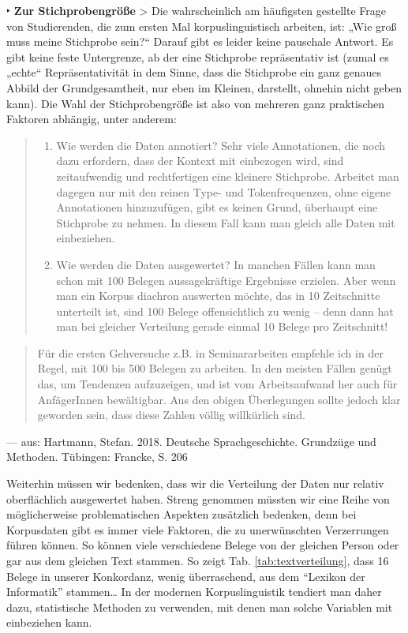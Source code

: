 \documentclass[]{article}
\providecommand{\tightlist}{%
  \setlength{\itemsep}{0pt}\setlength{\parskip}{0pt}}
\begin{document}
 ‣ \textbf{Zur Stichprobengröße} \textgreater{} Die wahrscheinlich am
häufigsten gestellte Frage von Studierenden, die zum ersten Mal
korpuslinguistisch arbeiten, ist: „Wie groß muss meine Stichprobe
sein?`` Darauf gibt es leider keine pauschale Antwort. Es gibt keine
feste Untergrenze, ab der eine Stichprobe repräsentativ ist (zumal es
„echte`` Repräsentativität in dem Sinne, dass die Stichprobe ein ganz
genaues Abbild der Grundgesamtheit, nur eben im Kleinen, darstellt,
ohnehin nicht geben kann). Die Wahl der Stichprobengröße ist also von
mehreren ganz praktischen Faktoren abhängig, unter anderem:

\begin{quote}
\begin{enumerate}
\def\labelenumi{\alph{enumi})}
\tightlist
\item
  Wie werden die Daten annotiert? Sehr viele Annotationen, die noch dazu
  erfordern, dass der Kontext mit einbezogen wird, sind zeitaufwendig
  und rechtfertigen eine kleinere Stichprobe. Arbeitet man dagegen nur
  mit den reinen Type- und Tokenfrequenzen, ohne eigene Annotationen
  hinzuzufügen, gibt es keinen Grund, überhaupt eine Stichprobe zu
  nehmen. In diesem Fall kann man gleich alle Daten mit einbeziehen.
\item
  Wie werden die Daten ausgewertet? In manchen Fällen kann man schon mit
  100 Belegen aussagekräftige Ergebnisse erzielen. Aber wenn man ein
  Korpus diachron auswerten möchte, das in 10 Zeitschnitte unterteilt
  ist, sind 100 Belege offensichtlich zu wenig -- denn dann hat man bei
  gleicher Verteilung gerade einmal 10 Belege pro Zeitschnitt!
\end{enumerate}
\end{quote}

\begin{quote}
Für die ersten Gehversuche z.B. in Seminararbeiten empfehle ich in der
Regel, mit 100 bis 500 Belegen zu arbeiten. In den meisten Fällen genügt
das, um Tendenzen aufzuzeigen, und ist vom Arbeitsaufwand her auch für
AnfägerInnen bewältigbar. Aus den obigen Überlegungen sollte jedoch klar
geworden sein, dass diese Zahlen völlig willkürlich sind.
\end{quote}

\hfill --- aus: Hartmann, Stefan. 2018. Deutsche Sprachgeschichte.
Grundzüge und Methoden. Tübingen: Francke, S. 206

Weiterhin müssen wir bedenken, dass wir die Verteilung der Daten nur
relativ oberflächlich ausgewertet haben. Streng genommen müssten wir
eine Reihe von möglicherweise problematischen Aspekten zusätzlich
bedenken, denn bei Korpusdaten gibt es immer viele Faktoren, die zu
unerwünschten Verzerrungen führen können. So können viele verschiedene
Belege von der gleichen Person oder gar aus dem gleichen Text stammen.
So zeigt Tab. \ref{tab:textverteilung}, dass 16 Belege in unserer
Konkordanz, wenig überraschend, aus dem ``Lexikon der Informatik''
stammen\ldots{} In der modernen Korpuslinguistik tendiert man daher
dazu, statistische Methoden zu verwenden, mit denen man solche Variablen
mit einbeziehen kann.
\end{document}
